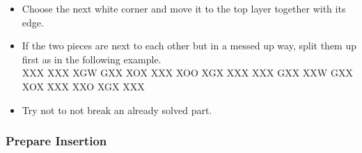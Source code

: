 \documentclass[9pt,dvipsnames]{extarticle}
\begin{document}
\begin{multicols*}{4}
\setlength\topsep{0pt}
\begin{itemize}
  \item Choose the next white corner and move it to the top layer together with
  its edge.
  \item If the two pieces are next to each other but in a messed up way, split
  them up first as in the following example.\\[.2cm]
  \RubikFaceUp%
  {X}{X}{X}
  {X}{X}{X}
  {X}{G}{W}%
  \RubikFaceRight%
  {G}{X}{X}
  {X}{O}{X}
  {X}{X}{X}%
  \RubikFaceFront%
  {X}{O}{O}
  {X}{G}{X}
  {X}{X}{X}%
  \ShowCube{\cubesize}{\cubescale}{\DrawRubikCubeRU}%
  \RubikRotation{\fourspot}%
  \RubikFaceUp%
  {X}{X}{X}
  {G}{X}{X}
  {X}{X}{W}%
  \RubikFaceRight%
  {G}{X}{X}
  {X}{O}{X}
  {X}{X}{X}%
  \RubikFaceFront%
  {X}{X}{O}
  {X}{G}{X}
  {X}{X}{X}%
  \ShowCube{\cubesize}{\cubescale}{\DrawRubikCubeRU}\\
  \item Try not to not break an already solved part.
\end{itemize}

\subsubsection*{Prepare Insertion}


\end{multicols*}
\end{document}
